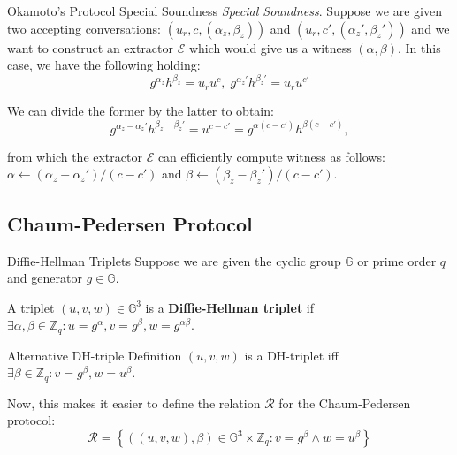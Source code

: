 \documentclass[xcolor={usenames,dvipsnames}]{beamer}
\begin{document}
    \begin{frame}{Okamoto's Protocol Special Soundness}
        \textit{Special Soundness}. Suppose we are given two accepting conversations: $(u_r,c,(\alpha_z,\beta_z))$ and $(u_r,c',(\alpha_z',\beta_z'))$ and we want to construct an extractor $\mathcal{E}$ which would give us a witness $(\alpha,\beta)$. In this case, we have the following holding:
        \begin{equation*}
            g^{\alpha_z}h^{\beta_z} = u_r u^c, \; g^{\alpha_z'}h^{\beta_z'} = u_r u^{c'}
        \end{equation*}
        
        We can divide the former by the latter to obtain:
        \begin{equation*}
            g^{\alpha_z - \alpha_z'}h^{\beta_z - \beta_z'} = u^{c-c'} = g^{\alpha(c-c')}h^{\beta(c-c')},
        \end{equation*}

        from which the extractor $\mathcal{E}$ can efficiently compute witness as follows: $\alpha \gets (\alpha_z - \alpha_z')\big/(c-c')$ and $\beta \gets (\beta_z - \beta_z')\big/(c-c')$.
    \end{frame}

    \subsection{Chaum-Pedersen Protocol}
    \begin{frame}{Diffie-Hellman Triplets}
        Suppose we are given the cyclic group $\mathbb{G}$ or prime order $q$ and generator $g \in \mathbb{G}$. 

        \begin{definition}
            A triplet $(u,v,w) \in \mathbb{G}^3$ is a \textbf{Diffie-Hellman triplet} if $\exists \alpha, \beta \in \mathbb{Z}_q: u = g^{\alpha}, v = g^{\beta}, w = g^{\alpha\beta}$.
        \end{definition}

        \begin{block}{Alternative DH-triple Definition}
            $(u,v,w)$ is a DH-triplet iff $\exists \beta \in \mathbb{Z}_q: v = g^{\beta}, w = u^{\beta}$.
        \end{block}

        Now, this makes it easier to define the relation $\mathcal{R}$ for the Chaum-Pedersen protocol:
        \begin{equation*}
            \mathcal{R} = \left\{ ((u,v,w), \beta) \in \mathbb{G}^3 \times \mathbb{Z}_q: v = g^{\beta} \wedge w = u^{\beta} \right\}
        \end{equation*}
    \end{frame}
\end{document}
